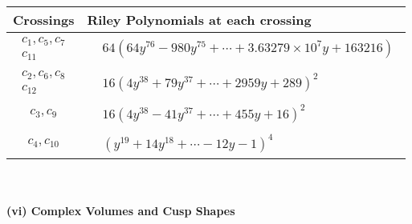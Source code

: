 \documentclass[1p]{elsarticle_modified}
\theoremstyle{definition}
\begin{document}
\begin{tabular}{m{50pt}|m{274pt}}
Crossings & \hspace{64pt}Riley Polynomials at each crossing \\
\hline $$\begin{aligned}c_{1},c_{5},c_{7}\\c_{11}\end{aligned}$$&$\begin{aligned}
&64(64 y^{76}-980 y^{75}+\cdots+3.63279\times10^{7} y+163216)
\end{aligned}$\\
\hline $$\begin{aligned}c_{2},c_{6},c_{8}\\c_{12}\end{aligned}$$&$\begin{aligned}
&16(4 y^{38}+79 y^{37}+\cdots+2959 y+289)^{2}
\end{aligned}$\\
\hline $$\begin{aligned}c_{3},c_{9}\end{aligned}$$&$\begin{aligned}
&16(4 y^{38}-41 y^{37}+\cdots+455 y+16)^{2}
\end{aligned}$\\
\hline $$\begin{aligned}c_{4},c_{10}\end{aligned}$$&$\begin{aligned}
&(y^{19}+14 y^{18}+\cdots-12 y-1)^{4}
\end{aligned}$\\
\hline
\end{tabular}\\~\\
\newpage\flushleft \textbf{(vi) Complex Volumes and Cusp Shapes}
\end{document}
